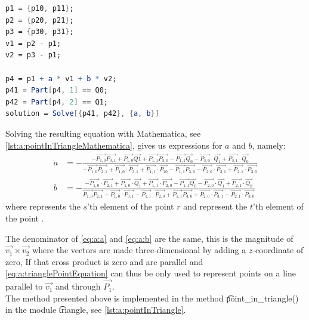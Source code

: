 	\begin{lstlisting}[float, language=Mathematica, label={lst:a:pointInTriangleMathematica}, caption={Mathematica code used to compute the to compute $a$ and $b$.}]
p1 = {p10, p11};
p2 = {p20, p21};
p3 = {p30, p31};
v1 = p2 - p1;
v2 = p3 - p1;

p4 = p1 + a * v1 + b * v2;
p41 = Part[p4, 1] == Q0;
p42 = Part[p4, 2] == Q1;
solution = Solve[{p41, p42}, {a, b}]
	\end{lstlisting}

Solving the resulting equation with Mathematica, see \autoref{lst:a:pointInTriangleMathematica}, gives us expressions for $a$ and $b$, namely:
	\begin{align}
	a &= -\frac{-\vec{P_{1,0}} \vec{P_{3,1}}+\vec{P_{1,0}} \vec{Q1}+\vec{P_{1,1}} \vec{P_{3,0}}-\vec{P_{1,1}}
   \vec{Q_0} - \vec{P_{3,0}} \cdot \vec{Q_1}+\vec{P_{3,1}} \cdot \vec{Q_0}}{ - \vec{P_{1,0}}
   \vec{P_{2,1}}+\vec{P_{1,0}} \cdot \vec{P_{3,1}}+\vec{P_{1,1}} \cdot \vec{P_{20}} - \vec{P_{1,1}}
   \vec{P_{3,0}} - \vec{P_{2,0}} \cdot \vec{P_{3,1}}+\vec{P_{2,1}} \cdot \vec{P_{3,0}}}\label{eq:a:a}\\
	b &=  - \frac{ - \vec{P_{1,0}} \cdot \vec{P_{2,1}}+\vec{P_{1,0}} \cdot \vec{Q_1}+\vec{P_{1,1}} \cdot \vec{P_{2,0}} - \vec{P_{1,1}}
   \vec{Q_0} - \vec{P_{2,0}} \cdot \vec{Q_1}+\vec{P_{2,1}} \cdot \vec{Q_0}}{\vec{P_{1,0}}
   \vec{P_{2,1}} - \vec{P_{1,0}} \cdot \vec{P_{3,1}} - \vec{P_{1,1}} \cdot \vec{P_{2,0}}+\vec{P_{1,1}}
   \vec{P_{3,0}}+\vec{P_{2,0}} \cdot \vec{P_{3,1}} - \vec{P_{2,1}} \cdot \vec{P_{3,0}}}\label{eq:a:b}
	\end{align}
where  represents the $s$'th element of the point $r$ and  represent the $t$'th element of the point .

The denominator of \eqref{eq:a:a} and \eqref{eq:a:b} are the same, this is the magnitude of $\vec{v_1} \times \vec{v_2}$ where the vectors are made three-dimensional by adding a $z$-coordinate of zero, If that cross product is zero  and  are parallel and \eqref{eq:a:trianglePointEquation} can thus be only used to represent points on a line parallel to $\vec{v_1}$ and through $\vec{P_1}$. \\

The method presented above is implemented in the method \t{point_in_triangle()} in the module \t{triangle}, see \autoref{lst:a:pointInTriangle}.



